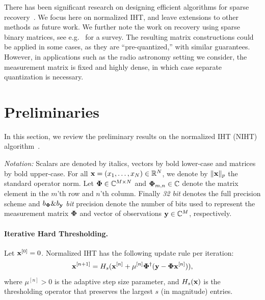 \documentclass{article}
\begin{document}
There has been significant research on 
designing efficient algorithms for sparse recovery~\cite{blumensath2011aiht, wei2015fiht, blanchard2013iht, cevher2011ht, liu2017dualiht}. 
We focus here on normalized IHT, and leave extensions to other methods as future work.
We further note the work on recovery using sparse binary matrices, see e.g.~\cite{gilbert2010sparse} for a survey. 
The resulting matrix constructions could be applied in some cases, as they are ``pre-quantized,'' with similar guarantees. However, in  applications such as the radio astronomy setting we consider, the measurement matrix is fixed and highly dense, in which case separate quantization is necessary. 


\vspace{-0.5em}
\section{Preliminaries}\label{section_iht}
\vspace{-1em}

In this section, we review the preliminary results on the normalized IHT (NIHT) algorithm~\cite{blumensath2010niht, blumensath2012greedy}.

{\it Notation:} Scalars are denoted by italics, vectors by bold lower-case and matrices by bold upper-case. For all ${\bf x}= (x_1, \ldots, x_N) \in \mathbb{R}^N$, we denote by $\|{\bf x}\|_p$ the standard operator norm. Let ${\bf \Phi} \in \mathbb{C}^{M\times N}$ and ${\bf \Phi}_{m, n}\in \mathbb{C}$ denote the matrix element in the $m$'th row and $n$'th column. Finally {\it 32 bit} denotes the full precision scheme and $b_{\bf \Phi}\&b_{\bf y}$ {\it bit} precision denote the number of bits used to represent the measurement matrix ${\bf \Phi}$ and vector of observations ${\bf y} \in \mathbb{C}^{M}$, respectively.


\vspace{-0.5em}
\paragraph{Iterative Hard Thresholding.} 
Let ${\bf x}^{[0]} = 0$. Normalized IHT has the following update rule per iteration: 
\begin{equation}\label{iht_update_rule}
\small
{\bf x}^{[n+1]} = H_s({\bf x}^{[n]} + \mu^{[n]}{\bf \Phi}^{\dagger}({\bf y}-{\bf \Phi}{\bf x}^{[n]})),
\end{equation}
where $\mu^{[n]}>0$ is the adaptive step size parameter, and $H_s({\bf x})$ is the
thresholding operator that preserves the largest $s$ (in magnitude) entries.
\end{document}
